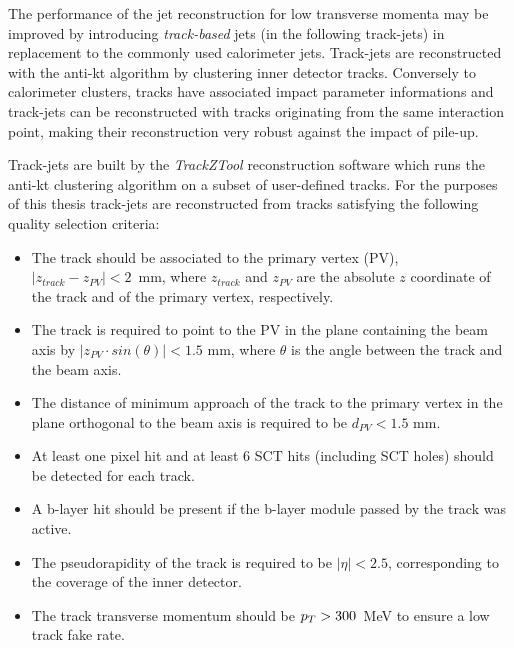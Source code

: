 The performance of the jet reconstruction for  low transverse momenta may be improved by introducing \emph{track-based} jets (in the following track-jets)
in replacement to the commonly used calorimeter jets.
Track-jets are reconstructed with the anti-kt algorithm by  clustering inner detector tracks.
Conversely to calorimeter clusters, tracks have associated impact parameter informations and  track-jets can be reconstructed
with tracks originating from the same interaction point, making their reconstruction very robust against the impact of pile-up.

Track-jets are built by the \emph{TrackZTool} reconstruction software which runs the anti-kt clustering 
algorithm on a subset of user-defined tracks.
For the purposes of this thesis track-jets are reconstructed  from tracks satisfying  the following
quality selection criteria:
\begin{itemize}
\item The track should be associated to the primary vertex (PV), \\$|z_{track} - z_{PV}| < 2$~mm, where $z_{track}$ and $z_{PV}$ are
 the absolute $z$ coordinate of the track and of the primary vertex, respectively.
 
\item The track is required to point to the PV in the plane  containing the beam axis by 
	$|z_{PV} \cdot sin(\theta)| < 1.5$ mm, where $\theta$ is the angle between the track and the beam axis.

\item The distance of minimum approach of the track to the  primary vertex  
in the plane orthogonal to the beam axis is required to be $d_{PV} < 1.5$ mm.


\item At least one pixel hit and at least 6 SCT hits (including SCT holes) should be detected for each track.

\item A  b-layer hit should be present if the b-layer module passed by the track was active.

\item The pseudorapidity of the track is required to be $|\eta| < 2.5$, corresponding to the coverage of the inner detector.

\item The track transverse momentum should be $p_{T} > 300 $~MeV to ensure a low track fake rate.

\end{itemize}
